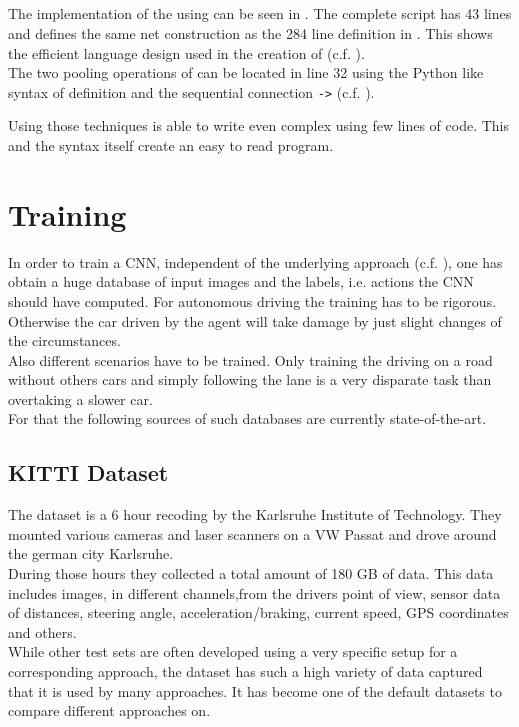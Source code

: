 \subsection{\cnnarch} \label{subsec: CNNArch Implementation}

The implementation of the \alexnet using \cnnarch can be seen in . The complete script has 43 lines and defines the same net construction as the 284 line definition in \caffe. This shows the efficient language design used in the creation of \cnnarch (c.f. ). \\
The two pooling operations of  can be located in line 32 using the Python like syntax of definition and the sequential connection \texttt{->} (c.f. ).

Using those techniques \cnnarch is able to write even complex \nn using few lines of code. This and the syntax itself create an easy to read program.

\section{Training}

In order to train a CNN, independent of the underlying approach (c.f. ), one has obtain a huge database of input images and the labels, i.e. actions the CNN should have computed. For autonomous driving the training has to be rigorous. Otherwise the car driven by the agent will take damage by just slight changes of the circumstances.\\
Also different scenarios have to be trained. Only training the driving on a road without others cars and simply following the lane is a very disparate task than overtaking a slower car.\\
For that the following sources of such databases are currently state-of-the-art.

\subsection{KITTI Dataset} \label{subsec: KITTI}

The \kitti dataset is a 6 hour recoding by the Karlsruhe Institute of Technology. They mounted various cameras and laser scanners on a VW Passat and drove around the german city Karlsruhe.\\
During those hours they collected a total amount of 180 GB of data. This data includes images, in different channels,from the drivers point of view, sensor data of distances, steering angle, acceleration/braking, current speed, GPS coordinates and others. \\
While other test sets are often developed using a very specific setup for a corresponding approach, the \kitti dataset has such a high variety of data captured that it is used by many approaches. It has become one of the default datasets to compare different approaches on. \cite{KITTI}


